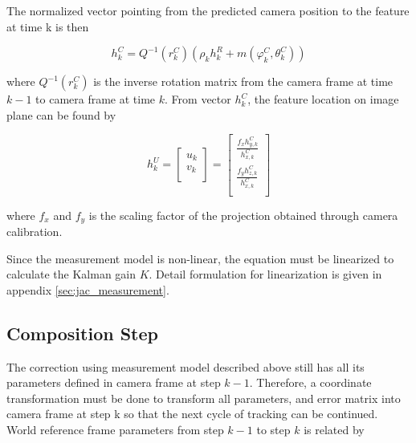 The normalized vector pointing from the predicted camera position to the 
feature at time k is then 

\begin{equation}
  h_{k}^{C}=Q^{-1}\left(r_{k}^{C}\right)\left(\rho _{k}h_{k}^{R}+m\left(\varphi_{ 
        k}^{C},\theta _{k}^{C}\right)\right)
\end{equation}

\noindent where $Q^{-1}(r_{k}^{C})$ is the inverse rotation matrix from the 
camera frame at time $k-1$ to camera frame at time $k$. From vector 
$h_{k}^{C}$, the feature location on image plane can be found by

\begin{equation}
h_{k}^{U}= \begin{bmatrix}
u_{k} \\
v_{k} \\
\end{bmatrix}=\begin{bmatrix}
\frac{f_{x}h_{y,k}^{C}}{h_{x,k}^{C}} \\
\frac{f_{y}h_{z,k}^{C}}{h_{x,k}^{C}} \\
\end{bmatrix}
\end{equation}

\noindent where $f_{x}$ and $f_{y}$ is the scaling factor of the projection 
obtained through camera calibration.

Since the measurement model is non-linear, the equation must be
linearized to calculate the Kalman gain $K$. Detail formulation for
linearization is given in appendix \ref{sec:jac_measurement}.

\subsection{Composition Step}

The correction using measurement model described above still has all
its parameters defined in camera frame at step $k-1$. Therefore, a
coordinate transformation must be done to transform all parameters,
and error matrix into camera frame at step k so that the next cycle of
tracking can be continued. World reference frame parameters from step
$k-1$ to step $k$ is related by

